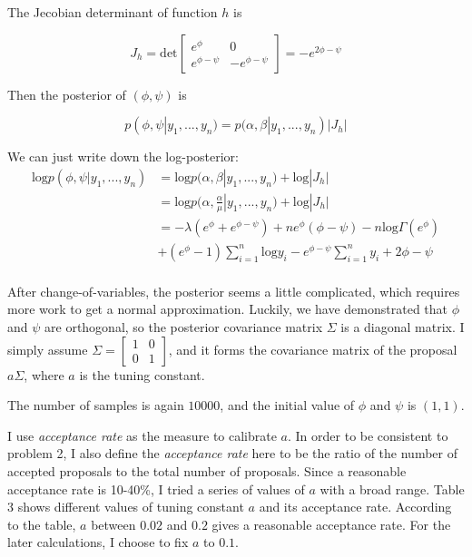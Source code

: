 \documentclass[12pt]{article}
\begin{document}
The Jecobian determinant of function $h$ is 

\begin{equation*}
J_h=\text{det}
\begin{bmatrix}
e^{\phi} & 0 \\ 
e^{\phi-\psi} & -e^{\phi-\psi}
\end{bmatrix}
= -e^{2\phi-\psi}
\end{equation*}

Then the posterior of $(\phi,\psi)$ is

\begin{equation*}
p(\phi,\psi|y_1,...,y_n) = p(\alpha,\beta|y_1,...,y_n)|J_h|
\end{equation*}

We can just write down the log-posterior:
\begin{equation}
\begin{split}
\text{log}p(\phi,\psi|y_1,...,y_n) &= \text{log}p(\alpha,\beta|y_1,...,y_n) + \text{log}|J_h| \\
&= \text{log}p(\alpha,\frac{\alpha}{\mu}|y_1,...,y_n) + \text{log}|J_h| \\
&= -\lambda(e^{\phi}+e^{\phi-\psi})+ne^{\phi}(\phi-\psi)-n\text{log}\Gamma(e^{\phi}) \\
& +(e^{\phi}-1) \sum_{i=1}^n \text{log}y_i - e^{\phi-\psi}\sum_{i=1}^n y_i + 2\phi-\psi \\
\end{split}
\end{equation}

After change-of-variables, the posterior seems a little complicated, which requires more work to get a normal approximation. Luckily, we have demonstrated that $\phi$ and $\psi$ are orthogonal, so the posterior covariance matrix $\Sigma$ is a diagonal matrix. I simply assume $\Sigma=
\begin{bmatrix}
1 & 0 \\
0 & 1
\end{bmatrix}$, and it forms the covariance matrix of the proposal $a\Sigma$, where $a$ is the tuning constant. 

The number of samples is again $10000$, and the initial value of $\phi$ and $\psi$ is $(1,1)$.

I use \textit{acceptance rate} as the measure to calibrate $a$. In order to be consistent to problem 2, I also define the \textit{acceptance rate} here to be the ratio of the number of accepted proposals to the total number of proposals. Since a reasonable acceptance rate is 10-40\%, I tried a series of values of $a$ with a broad range. Table 3 shows different values of tuning constant $a$ and its acceptance rate. According to the table, $a$ between $0.02$ and $0.2$ gives a reasonable acceptance rate. For the later calculations, I choose to fix $a$ to $0.1$.
\end{document}
